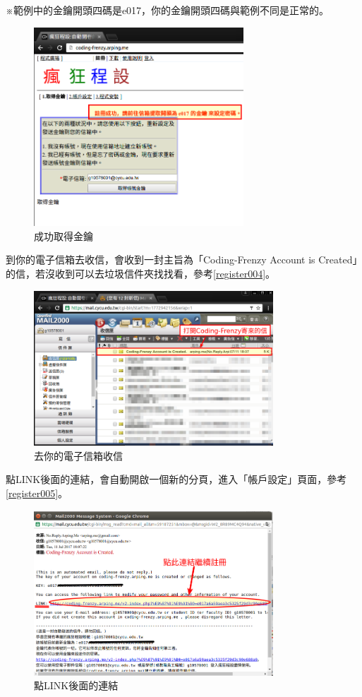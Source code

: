 ※範例中的金鑰開頭四碼是e017，你的金鑰開頭四碼與範例不同是正常的。
\begin{figure}[H]
	\centering
	\includegraphics[width=0.7\textwidth]{fig/install_and_setting/register_003}
	\caption{成功取得金鑰}
	\label{register003}
\end{figure}

到你的電子信箱去收信，會收到一封主旨為「Coding-Frenzy Account is Created」的信，若沒收到可以去垃圾信件夾找找看，參考\autoref{register004}。
\begin{figure}[H]
	\centering
	\includegraphics[width=0.8\textwidth]{fig/install_and_setting/register_004}
	\caption{去你的電子信箱收信}
	\label{register004}
\end{figure}

點LINK後面的連結，會自動開啟一個新的分頁，進入「帳戶設定」頁面，參考\autoref{register005}。
\begin{figure}[H]
	\centering
	\includegraphics[width=0.8\textwidth]{fig/install_and_setting/register_005}
	\caption{點LINK後面的連結}
	\label{register005}
\end{figure}

